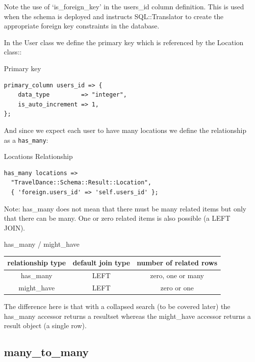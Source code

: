 Note the use of ‘is\_foreign\_key’ in the users\_id column definition. This is used when the schema is deployed and instructs SQL::Translator to create the appropriate foreign key constraints in the database.

In the User class we define the primary key which is referenced by the Location class::

\begin{frame}[fragile]{Primary key}
\begin{lstlisting}
primary_column users_id => {
    data_type         => "integer",
    is_auto_increment => 1,
};
\end{lstlisting}
\end{frame}

And since we expect each user to have many locations we define the relationship as a \verb|has_many|:

\begin{frame}[fragile]{Locations Relationship}
\begin{lstlisting}
has_many locations =>
  "TravelDance::Schema::Result::Location",
  { 'foreign.users_id' => 'self.users_id' };
\end{lstlisting}
\end{frame}

Note: has\_many does not mean that there must be many related items but only that there can be many. One or zero related items is also possible (a LEFT JOIN).


\begin{frame}{has\_many / might\_have}
\begin{table}
\begin{tabular}{c | c | c}
relationship type & default join type & number of related rows \\
\hline
has\_many & LEFT & zero, one or many \\
might\_have & LEFT & zero or one \\
\end{tabular}
\end{table}
\end{frame}

The difference here is that with a collapsed search (to be covered later)
the has\_many accessor returns a resultset whereas the might\_have accessor
returns a result object (a single row).

\subsection{many\_to\_many}

